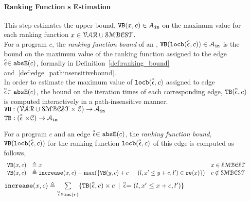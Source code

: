 \paragraph{Ranking Function  s Estimation}
This step estimates the upper bound, $\varinvar(x, c) \in \mathcal{A}_{\lin}$
on the maximum value for each ranking function   $x \in  \mathcal{VAR} \cup \constdom$.
\\
For a program $c$, the \emph{ranking function bound} of an ,
$\varinvar(\locbound(\absevent, c)) \in \mathcal{A}_{\lin}$ is 
the bound on the maximum value of the ranking function  
assigned to the edge $\absevent \in \absE(c)$, formally in Definition~\ref{def:ranking_bound} and~\ref{def:edge_pathinsensitivebound}.
\\
In order to estimate the maximum value of $\locbound(\absevent, c)$ assigned to edge $\absevent \in \absE(c)$,
the bound on the iteration times of each corresponding edge, $\absclr(\absevent, c)$ 
is computed interactively in a path-insensitive manner.
\\ 
$ \varinvar: (\mathcal{VAR} \cup \constdom  \times \cdom) \to \mathcal{A}_{\lin}$
\\
$\absclr: (\absevent \times \cdom) \to \mathcal{A}_{\lin}$
\begin{defn}
  \label{def:ranking_bound}
For a program $c$ and an edge $\absevent \in \absE(c)$,
the \emph{ranking function bound}, $\varinvar(\locbound(\absevent, c))$ for the ranking function $\locbound(\absevent, c)$
of this edge
is computed as follows,
  \[ 
\begin{array}{lll}
  \varinvar(x, c) & \triangleq x & x \in \constdom \\
  \varinvar(x, c) & \triangleq \incrs(x, c) + \max(\{\varinvar(y, c) + c ~\mid~ (l, x' \leq y + c, l') \in \reset(x)\}) & c \notin \constdom
\end{array}
\]
%
$\incrs(x, c) \triangleq \sum\limits_{\absevent \in \inc(v)}\{\absclr(\absevent, c) \times c ~\mid~ \absevent = (l, x' \leq x + c, l')\}$
\end{defn}
